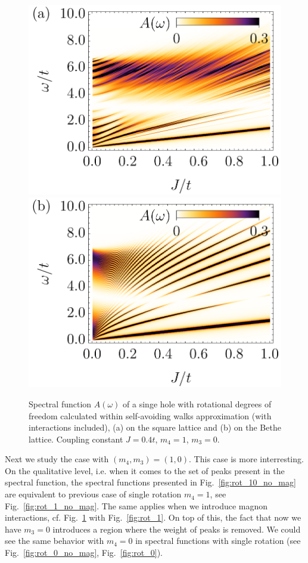 \documentclass[%
 reprint,
 amsmath,amssymb,
 aps,
prb,
floatfix,
]{revtex4-1}
\begin{document}
\begin{figure}[ht!]
	\includegraphics[width=0.49\columnwidth]
	{./figures/square/[1, 0].png}
	\includegraphics[width=0.49\columnwidth]
	{./figures/bethe/[1, 0].png}
	\caption{
		Spectral function $A(\omega)$ of a singe hole with rotational degrees of freedom calculated within self-avoiding walks approximation (with interactions included), (a) on the square lattice and (b) on the Bethe lattice. Coupling constant $J=0.4t$, $m_4 = 1$, $m_3 = 0$.
	}\label{fig:rot_10}
\end{figure}

Next we study the case with $(m_4, m_3) = (1,0)$. This case is more interresting. On the qualitative level, i.e. when it comes to the set of peaks present in the spectral function, the spectral functions presented in Fig.~\ref{fig:rot_10_no_mag} are equivalent to previous case of single rotation $m_4 = 1$, see Fig.~\ref{fig:rot_1_no_mag}. The same applies when we introduce magnon interactions, cf. Fig.~\ref{fig:rot_10} with Fig.~\ref{fig:rot_1}. On top of this, the fact that now we have $m_3 = 0$ introduces a region where the weight of peaks is removed. We could see the same behavior with $m_4 = 0$ in spectral functions with single rotation (see Fig.~\ref{fig:rot_0_no_mag}, Fig.~\ref{fig:rot_0}).
\end{document}
